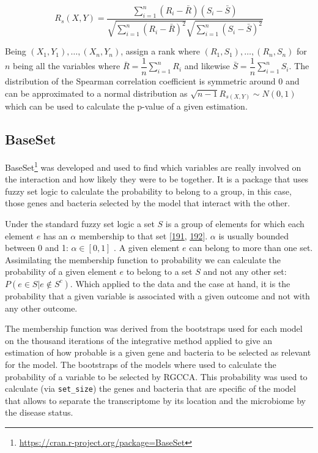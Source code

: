 \documentclass[
  a4paper,
]{book}
\DeclareRobustCommand{\href}[2]{#2\footnote{\url{#1}}}
\begin{document}
\[
R_s(X,Y) = \dfrac{\sum_{i=1}^n (R_i - \bar{R}) (S_i - \bar{S} )}{\sqrt{\sum_{i=1}^n (R_i - \bar{R})^2}\sqrt{\sum_{i=1}^n (S_i - \bar{S})^2}}
\]

Being \((X_1 , Y_1 ),\dots, (X_n , Y_n)\), assign a rank where \((R_1 , S_1 ), \dots , (R_n , S_n )\) for \(n\) being all the variables where \(\bar{R}=\dfrac{1}{n}\sum_{i=1}^n R_i\) and likewise \(\bar{S}=\dfrac{1}{n}\sum_{i=1}^n S_i\).
The distribution of the Spearman correlation coefficient is symmetric around 0 and can be approximated to a normal distribution as \(\sqrt{n-1}R_{s(X,Y)} \sim N(0,1)\) which can be used to calculate the p-value of a given estimation.

\hypertarget{baseset}{%
\subsection{BaseSet}\label{baseset}}

\href{https://cran.r-project.org/package=BaseSet}{BaseSet} was developed and used to find which variables are really involved on the interaction and how likely they were to be together.
It is a package that uses fuzzy set logic to calculate the probability to belong to a group, in this case, those genes and bacteria selected by the model that interact with the other.

Under the standard fuzzy set logic a set \(S\) is a group of elements for which each element \(e\) has an \(\alpha\) membership to that set {[}\protect\hyperlink{ref-filzmoser2004}{191}, \protect\hyperlink{ref-dubois1993}{192}{]}.
\(\alpha\) is usually bounded between 0 and 1: \(\alpha \in [0, 1]\) .
A given element \(e\) can belong to more than one set.
Assimilating the membership function to probability we can calculate the probability of a given element \(e\) to belong to a set \(S\) and not any other set: \(P(e \in S|e \not \in S^c)\).
Which applied to the data and the case at hand, it is the probability that a given variable is associated with a given outcome and not with any other outcome.

The membership function was derived from the bootstraps used for each model on the thousand iterations of the integrative method applied to give an estimation of how probable is a given gene and bacteria to be selected as relevant for the model.
The bootstraps of the models where used to calculate the probability of a variable to be selected by RGCCA.
This probability was used to calculate (via \texttt{set\_size}) the genes and bacteria that are specific of the model that allows to separate the transcriptome by its location and the microbiome by the disease status.
\end{document}
